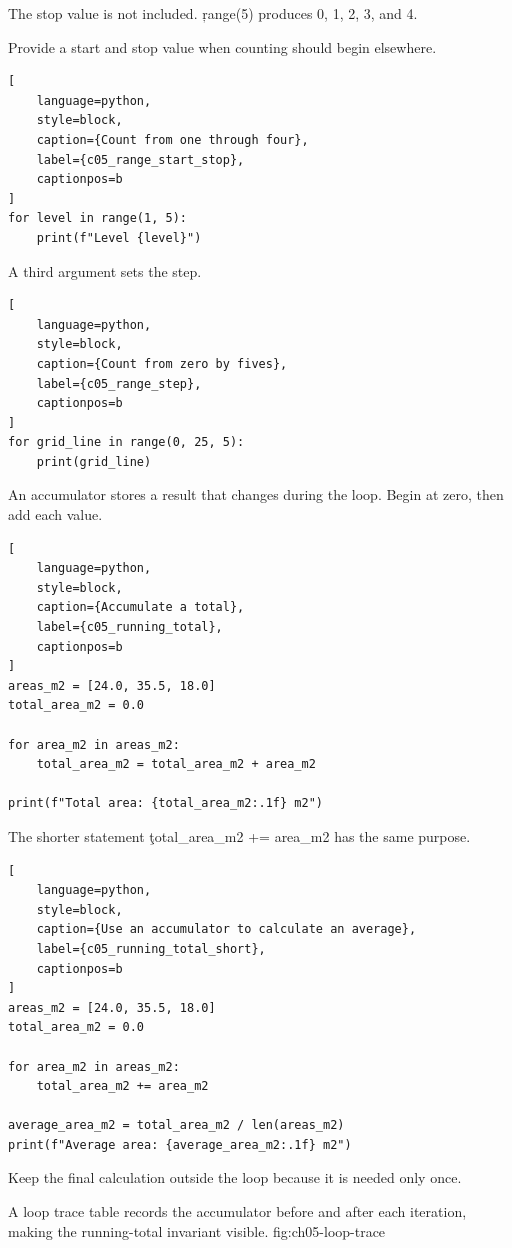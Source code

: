 The stop value is not included. \c{range(5)} produces 0, 1, 2, 3, and 4.

Provide a start and stop value when counting should begin elsewhere.

\begin{lstlisting}[
    language=python,
    style=block,
    caption={Count from one through four},
    label={c05_range_start_stop},
    captionpos=b
]
for level in range(1, 5):
    print(f"Level {level}")
\end{lstlisting}

A third argument sets the step.

\begin{lstlisting}[
    language=python,
    style=block,
    caption={Count from zero by fives},
    label={c05_range_step},
    captionpos=b
]
for grid_line in range(0, 25, 5):
    print(grid_line)
\end{lstlisting}


An accumulator stores a result that changes during the loop. Begin at zero,
then add each value.

\begin{lstlisting}[
    language=python,
    style=block,
    caption={Accumulate a total},
    label={c05_running_total},
    captionpos=b
]
areas_m2 = [24.0, 35.5, 18.0]
total_area_m2 = 0.0

for area_m2 in areas_m2:
    total_area_m2 = total_area_m2 + area_m2

print(f"Total area: {total_area_m2:.1f} m2")
\end{lstlisting}

The shorter statement \c{total_area_m2 += area_m2} has the same purpose.

\begin{lstlisting}[
    language=python,
    style=block,
    caption={Use an accumulator to calculate an average},
    label={c05_running_total_short},
    captionpos=b
]
areas_m2 = [24.0, 35.5, 18.0]
total_area_m2 = 0.0

for area_m2 in areas_m2:
    total_area_m2 += area_m2

average_area_m2 = total_area_m2 / len(areas_m2)
print(f"Average area: {average_area_m2:.1f} m2")
\end{lstlisting}

Keep the final calculation outside the loop because it is needed only once.

{A loop trace table records the accumulator before and after each iteration, making the running-total invariant visible.}
{fig:ch05-loop-trace}

